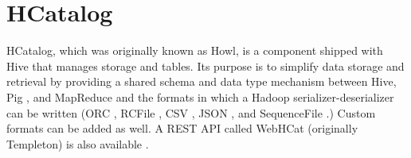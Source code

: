 \section{HCatalog}

HCatalog, which was originally known as Howl, is a component shipped
with Hive  that manages storage and tables. Its purpose is
to simplify data storage and retrieval by providing a shared schema
and data type mechanism between Hive, Pig , and MapReduce
 and the formats in which a Hadoop 
serializer-deserializer can be written (ORC , RCFile
, CSV , JSON , and SequenceFile
.) Custom formats can be added as well. A REST
 API called WebHCat  (originally Templeton)
is also available \cite{hid-sp18-419-www-hc-wiki}.
